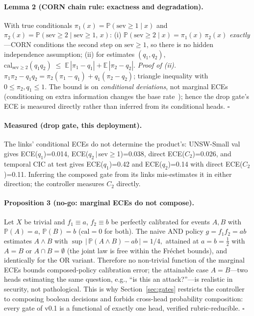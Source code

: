 \documentclass[sigconf,anonymous=false]{acmart}
\begin{document}
\paragraph{Lemma 2 (CORN chain rule: exactness and degradation).} With true conditionals $\pi_1(x) = \mathbb{P}(\mathrm{sev}\ge1 \mid x)$ and $\pi_2(x) = \mathbb{P}(\mathrm{sev}\ge2 \mid \mathrm{sev}\ge1,\,x)$: (i) $\mathbb{P}(\mathrm{sev}\ge2 \mid x) = \pi_1(x)\,\pi_2(x)$ \emph{exactly}---CORN conditions the second step on $\mathrm{sev}\ge1$, so there is no hidden independence assumption; (ii) for estimates $(q_1, q_2)$,
$\mathrm{cal}_{\mathrm{sev}\ge2}(q_1 q_2) \;\le\; \mathbb{E}\,|\pi_1 - q_1| + \mathbb{E}\,|\pi_2 - q_2|.$
\emph{Proof of (ii).} $\pi_1\pi_2 - q_1 q_2 = \pi_2(\pi_1 - q_1) + q_1(\pi_2 - q_2)$; triangle inequality with $0 \le \pi_2, q_1 \le 1$. The bound is on \emph{conditional deviations}, not marginal ECEs (conditioning on extra information changes the base rate~\cite{kleinberg2017}); hence the drop gate's ECE is measured directly rather than inferred from its conditional heads. \hfill$\square$

\paragraph{Measured (drop gate, this deployment).} The links' conditional ECEs do not determine the product's: UNSW-Small val gives ECE($q_1$){=}0.014, ECE($q_2\,\vert\,$sev$\ge$1){=}0.038, direct ECE($C_2$){=}0.026, and temporal CIC at test gives ECE($q_1$){=}0.42 and ECE($q_2$){=}0.14 with direct ECE($C_2$){=}0.11. Inferring the composed gate from its links mis-estimates it in either direction; the controller measures $C_2$ directly.
\paragraph{Proposition 3 (no-go: marginal ECEs do not compose).} Let $X$ be trivial and $f_1 \equiv a$, $f_2 \equiv b$ be perfectly calibrated for events $A, B$ with $\mathbb{P}(A){=}a$, $\mathbb{P}(B){=}b$ ($\mathrm{cal} = 0$ for both). The naive AND policy $g = f_1 f_2 = ab$ estimates $A\wedge B$ with
$\sup\,\big|\,\mathbb{P}(A\wedge B) - ab\,\big| = 1/4,$
attained at $a=b=\tfrac12$ with $A{=}B$ or $A\cap B{=}\emptyset$ (the joint law is free within the Fr\'echet bounds), and identically for the OR variant. Therefore no non-trivial function of the marginal ECEs bounds composed-policy calibration error; the attainable case $A{=}B$---two heads estimating the same question, e.g., ``is this an attack?''---is realistic in security, not pathological. This is why Section~\ref{sec:gates} restricts the controller to composing boolean decisions and forbids cross-head probability composition: every gate of v0.1 is a functional of exactly one head, verified rubric-reducible. \hfill$\square$
\end{document}

